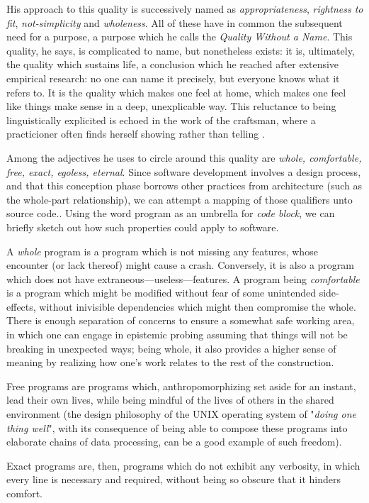 His approach to this quality is successively named as \emph{appropriateness}, \emph{rightness to fit}, \emph{not-simplicity} and \emph{wholeness}. All of these have in common the subsequent need for a purpose, a purpose which he calls the \emph{Quality Without a Name}. This quality, he says, is complicated to name, but nonetheless exists: it is, ultimately, the quality which sustains life, a conclusion which he reached after extensive empirical research: no one can name it precisely, but everyone knows what it refers to. It is the quality which makes one feel at home, which makes one feel like things make sense in a deep, unexplicable way. This reluctance to being linguistically explicited is echoed in the work of the craftsman, where a practicioner often finds herself showing rather than telling \citep{pye_nature_2008}.

Among the adjectives he uses to circle around this quality are \emph{whole, comfortable, free, exact, egoless, eternal}. Since software development involves a design process, and that this conception phase borrows other practices from architecture (such as the whole-part relationship), we can attempt a mapping of those qualifiers unto source code.. Using the word program as an umbrella for \emph{code block}, we can briefly sketch out how such properties could apply to software.

A \emph{whole} program is a program which is not missing any features, whose encounter (or lack thereof) might cause a crash. Conversely, it is also a program which does not have extraneous—useless—features. A program being \emph{comfortable} is a program which might be modified without fear of some unintended side-effects, without inivisible dependencies which might then compromise the whole. There is enough separation of concerns to ensure a somewhat safe working area, in which one can engage in epistemic probing assuming that things will not be breaking in unexpected ways; being whole, it also provides a higher sense of meaning by realizing how one's work relates to the rest of the construction.

Free programs are programs which, anthropomorphizing set aside for an instant, lead their own lives, while being mindful of the lives of others in the shared environment (the design philosophy of the UNIX operating system of "\emph{doing one thing well}", with its consequence of being able to compose these programs into elaborate chains of data processing, can be a good example of such freedom).

Exact programs are, then, programs which do not exhibit any verbosity, in which every line is necessary and required, without being so obscure that it hinders comfort.

